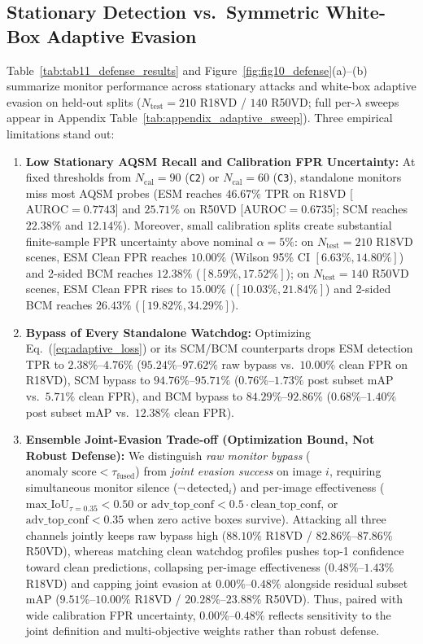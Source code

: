\documentclass[preprint,10pt]{elsarticle}
\begin{document}
\subsection{Stationary Detection vs.\ Symmetric White-Box Adaptive Evasion}
Table~\ref{tab:tab11_defense_results} and Figure~\ref{fig:fig10_defense}(a)--(b) summarize monitor performance across stationary attacks and white-box adaptive evasion on held-out splits ($N_{\mathrm{test}} = 210$ R18VD / $140$ R50VD; full per-$\lambda$ sweeps appear in Appendix Table~\ref{tab:appendix_adaptive_sweep}). Three empirical limitations stand out:
\begin{enumerate}
    \item \textbf{Low Stationary AQSM Recall and Calibration FPR Uncertainty:} At fixed thresholds from $N_{\mathrm{cal}}=90$ (\texttt{C2}) or $N_{\mathrm{cal}}=60$ (\texttt{C3}), standalone monitors miss most AQSM probes (ESM reaches $46.67\%$ TPR on R18VD [$\text{AUROC} = 0.7743$] and $25.71\%$ on R50VD [$\text{AUROC} = 0.6735$]; SCM reaches $22.38\%$ and $12.14\%$). Moreover, small calibration splits create substantial finite-sample FPR uncertainty above nominal $\alpha = 5\%$: on $N_{\mathrm{test}}=210$ R18VD scenes, ESM Clean FPR reaches $10.00\%$ (Wilson 95\% CI $[6.63\%, 14.80\%]$) and 2-sided BCM reaches $12.38\%$ ($[8.59\%, 17.52\%]$); on $N_{\mathrm{test}}=140$ R50VD scenes, ESM Clean FPR rises to $15.00\%$ ($[10.03\%, 21.84\%]$) and 2-sided BCM reaches $26.43\%$ ($[19.82\%, 34.29\%]$).
    \item \textbf{Bypass of Every Standalone Watchdog:} Optimizing Eq.~(\ref{eq:adaptive_loss}) or its SCM/BCM counterparts drops ESM detection TPR to $2.38\%$--$4.76\%$ ($95.24\%$--$97.62\%$ raw bypass vs.\ $10.00\%$ clean FPR on R18VD), SCM bypass to $94.76\%$--$95.71\%$ ($0.76\%$--$1.73\%$ post subset mAP vs.\ $5.71\%$ clean FPR), and BCM bypass to $84.29\%$--$92.86\%$ ($0.68\%$--$1.40\%$ post subset mAP vs.\ $12.38\%$ clean FPR).
    \item \textbf{Ensemble Joint-Evasion Trade-off (Optimization Bound, Not Robust Defense):} We distinguish \textit{raw monitor bypass} ($\text{anomaly score} < \tau_{\mathrm{fused}}$) from \textit{joint evasion success} on image $i$, requiring simultaneous monitor silence ($\neg\,\text{detected}_i$) and per-image effectiveness ($\text{max\_IoU}_{\tau=0.35} < 0.50$ or $\text{adv\_top\_conf} < 0.5 \cdot \text{clean\_top\_conf}$, or $\text{adv\_top\_conf} < 0.35$ when zero active boxes survive). Attacking all three channels jointly keeps raw bypass high ($88.10\%$ R18VD / $82.86\%$--$87.86\%$ R50VD), whereas matching clean watchdog profiles pushes top-1 confidence toward clean predictions, collapsing per-image effectiveness ($0.48\%$--$1.43\%$ R18VD) and capping joint evasion at $0.00\%$--$0.48\%$ alongside residual subset mAP ($9.51\%$--$10.00\%$ R18VD / $20.28\%$--$23.88\%$ R50VD). Thus, paired with wide calibration FPR uncertainty, $0.00\%$--$0.48\%$ reflects sensitivity to the joint definition and multi-objective weights rather than robust defense.
\end{enumerate}
\end{document}
